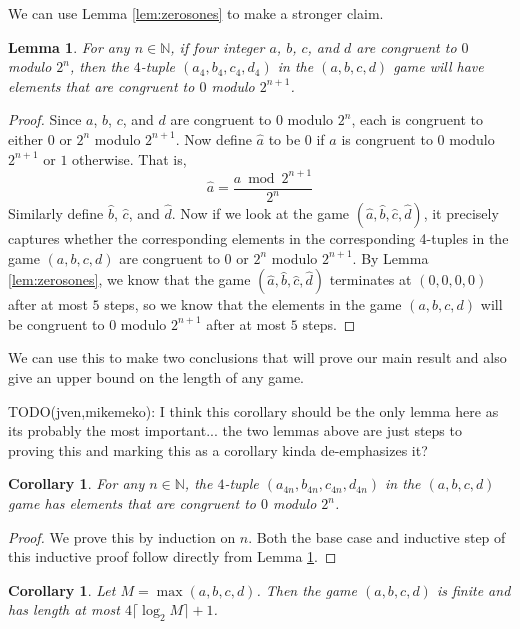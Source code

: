 \documentclass[12pt]{amsart}
\newtheorem{corollary}[theorem]{Corollary}
\newtheorem{lemma}[theorem]{Lemma}
\newcommand{\znn}{\mathbb{N}}
\begin{document}
We can use Lemma \ref{lem:zerosones} to make a stronger claim.

\begin{lemma}
For any $n \in \znn$, if four integer $a$, $b$, $c$, and $d$ are congruent to $0$ modulo $2^n$, then the $4$-tuple $(a_4, b_4, c_4, d_4)$ in the $(a,b,c,d)$ game will have elements that are congruent to $0$ modulo $2^{n+1}$.
\label{lem:evenodd}
\end{lemma}

\begin{proof}
Since $a$, $b$, $c$, and $d$ are congruent to $0$ modulo $2^n$, each is congruent to either $0$ or $2^n$ modulo $2^{n+1}$. Now define $\hat{a}$ to be $0$ if $a$ is congruent to $0$ modulo $2^{n+1}$ or $1$ otherwise. That is,
$$
\hat{a} = \frac{a \bmod{2^{n+1}}}{2^n}
$$
Similarly define $\hat{b}$, $\hat{c}$, and $\hat{d}$. Now if we look at the game $(\hat{a},\hat{b},\hat{c},\hat{d})$, it precisely captures whether the corresponding elements in the corresponding 4-tuples in the game $(a,b,c,d)$ are congruent to $0$ or $2^n$ modulo $2^{n+1}$. By Lemma \ref{lem:zerosones}, we know that the game $(\hat{a},\hat{b},\hat{c},\hat{d})$ terminates at $(0,0,0,0)$ after at most $5$ steps, so we know that the elements in the game $(a,b,c,d)$ will be congruent to $0$ modulo $2^{n+1}$ after at most $5$ steps.
\end{proof}

We can use this to make two conclusions that will prove our main result and also give an upper bound on the length of any game.

TODO(jven,mikemeko): I think this corollary should be the only lemma here as its probably the most important... the two lemmas above are just steps to proving this and marking this as a corollary kinda de-emphasizes it?

\begin{corollary}
For any $n \in \znn$, the $4$-tuple $(a_{4n}, b_{4n}, c_{4n}, d_{4n})$ in the $(a,b,c,d)$ game has elements that are congruent to $0$ modulo $2^n$.
\label{cor:pow2}
\end{corollary}

\begin{proof}
We prove this by induction on $n$.
Both the base case and inductive step of this inductive proof follow directly from Lemma \ref{lem:evenodd}.
\end{proof}

\begin{corollary}
Let $M=\max(a,b,c,d)$. Then the game $(a,b,c,d)$ is finite and has length at most $4\lceil\log_2{M}\rceil + 1$.
\end{corollary}
\end{document}

